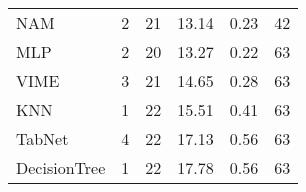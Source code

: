 \begin{tabular}{lrrrrr}
NAM                &                  2 &  21 &  13.14 &                           0.23 &    42 \\
MLP                &                  2 &  20 &  13.27 &                           0.22 &    63 \\
VIME               &                  3 &  21 &  14.65 &                           0.28 &    63 \\
KNN                &                  1 &  22 &  15.51 &                           0.41 &    63 \\
TabNet             &                  4 &  22 &  17.13 &                           0.56 &    63 \\
DecisionTree       &                  1 &  22 &  17.78 &                           0.56 &    63 \\
\bottomrule
\end{tabular}
